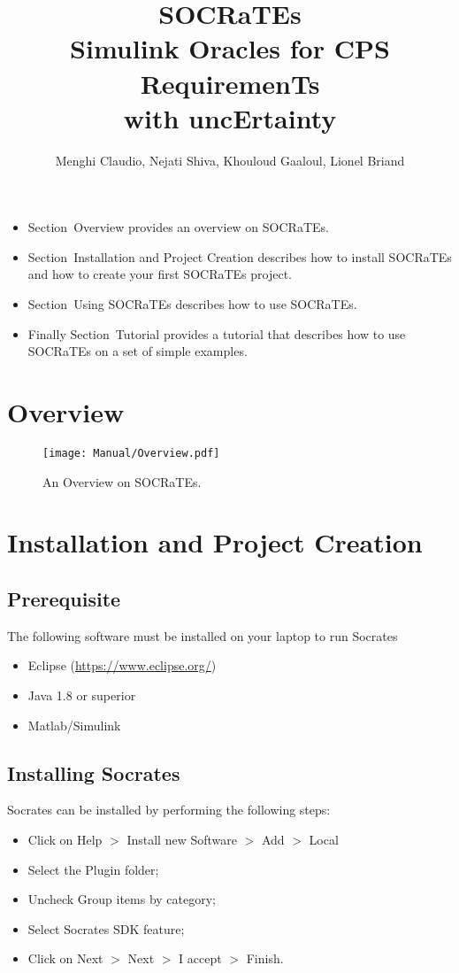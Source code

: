 \documentclass[12pt]{extarticle}
\title{\textbf{SOCRaTEs}\\
\textbf{S}imulink \textbf{O}racles for \textbf{C}PS \textbf{R}equiremen\textbf{T}s\\ with unc\textbf{E}rtainty}
\author{Menghi Claudio, Nejati Shiva,  Khouloud Gaaloul,  Lionel Briand}
\date{\vspace{-5ex}}
\newcommand{\<}{\langle}
\renewcommand{\>}{\rangle}
\theoremstyle{definition}
\begin{document}
\maketitle

\vspace{1cm}
\begin{itemize}
\item Section~Overview provides an overview on SOCRaTEs.
\item Section~Installation and Project Creation describes how to install SOCRaTEs and how to create your first SOCRaTEs project.
\item Section~Using SOCRaTEs describes how to use SOCRaTEs.
\item Finally Section~Tutorial provides a  tutorial that describes how to use SOCRaTEs on a set of simple examples.
\end{itemize}





\section{Overview}

\begin{figure}
\caption{An Overview on SOCRaTEs.}
  \centering
    \texttt{[image: Manual/Overview.pdf]}
\end{figure}

\section{Installation and Project Creation}

\subsection{Prerequisite}
The following software must be installed on your laptop to run Socrates
\begin{itemize}
\item Eclipse (\url{https://www.eclipse.org/})
\item Java 1.8 or superior
\item Matlab/Simulink
\end{itemize}

\subsection{Installing Socrates}
Socrates can be installed by performing the following steps:
\begin{itemize}
\item Click on Help $>$ Install new Software $>$ Add $>$ Local
\item Select the Plugin folder;
\item Uncheck Group items by category;
\item Select Socrates SDK feature;
\item Click on Next $>$ Next $>$ I accept $>$ Finish.
\end{itemize}
\end{document}
